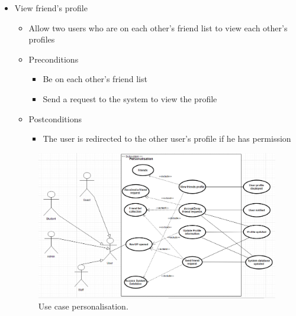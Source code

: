 \documentclass[12pt]{article}
\begin{document}
\begin{enumerate}
\begin{itemize}
				\item View friend’s profile
				\begin{itemize}
					\item Allow two users who are on each other’s friend list to view each other’s profiles
					\item Preconditions
					\begin{itemize}
						\item Be on each other’s friend list
						\item Send a request to the system to view the profile
					\end{itemize}
					\item Postconditions
					\begin{itemize}
						\item The user is redirected to the other user’s profile if he has permission
					\end{itemize}
				\end{itemize}
				\begin{figure}
				    \includegraphics[width=\linewidth]{useCasePersonalisation.png}
				    \caption{Use case personalisation.}
  \label{fig:boat1}
				\end{figure}
			\end{itemize}
			
		  
		\end{enumerate}
			
\end{document}

